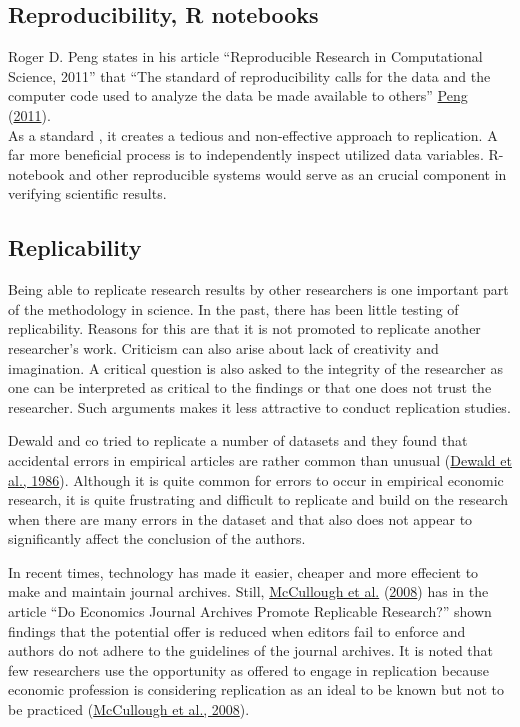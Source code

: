 \documentclass[
  12pt,
]{article}
\begin{document}
\hypertarget{reproducibility-r-notebooks}{%
\subsection{Reproducibility, R
notebooks}\label{reproducibility-r-notebooks}}

Roger D. Peng states in his article ``Reproducible Research in
Computational Science, 2011'' that ``The standard of reproducibility
calls for the data and the computer code used to analyze the data be
made available to others'' \protect\hyperlink{ref-peng2011}{Peng}
(\protect\hyperlink{ref-peng2011}{2011}).\\
As a standard , it creates a tedious and non-effective approach to
replication. A far more beneficial process is to independently inspect
utilized data variables. R-notebook and other reproducible systems would
serve as an crucial component in verifying scientific results.

\hypertarget{replicability}{%
\subsection{Replicability}\label{replicability}}

Being able to replicate research results by other researchers is one
important part of the methodology in science. In the past, there has
been little testing of replicability. Reasons for this are that it is
not promoted to replicate another researcher's work. Criticism can also
arise about lack of creativity and imagination. A critical question is
also asked to the integrity of the researcher as one can be interpreted
as critical to the findings or that one does not trust the researcher.
Such arguments makes it less attractive to conduct replication studies.

Dewald and co tried to replicate a number of datasets and they found
that accidental errors in empirical articles are rather common than
unusual (\protect\hyperlink{ref-dewald1986}{Dewald et al., 1986}).
Although it is quite common for errors to occur in empirical economic
research, it is quite frustrating and difficult to replicate and build
on the research when there are many errors in the dataset and that also
does not appear to significantly affect the conclusion of the authors.

In recent times, technology has made it easier, cheaper and more
effecient to make and maintain journal archives. Still,
\protect\hyperlink{ref-mccullough2008}{McCullough et al.}
(\protect\hyperlink{ref-mccullough2008}{2008}) has in the article ``Do
Economics Journal Archives Promote Replicable Research?'' shown findings
that the potential offer is reduced when editors fail to enforce and
authors do not adhere to the guidelines of the journal archives. It is
noted that few researchers use the opportunity as offered to engage in
replication because economic profession is considering replication as an
ideal to be known but not to be practiced
(\protect\hyperlink{ref-mccullough2008}{McCullough et al., 2008}).
\end{document}
